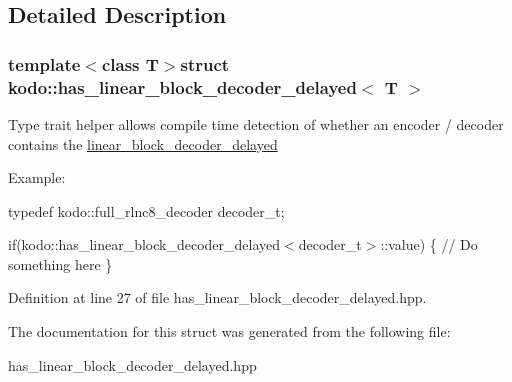 \subsection{Detailed Description}
\subsubsection*{template$<$class T$>$struct kodo\-::has\-\_\-linear\-\_\-block\-\_\-decoder\-\_\-delayed$<$ T $>$}

Type trait helper allows compile time detection of whether an encoder / decoder contains the \hyperlink{classkodo_1_1linear__block__decoder__delayed}{linear\-\_\-block\-\_\-decoder\-\_\-delayed}

Example\-:

typedef kodo\-::full\-\_\-rlnc8\-\_\-decoder decoder\-\_\-t;

if(kodo\-::has\-\_\-linear\-\_\-block\-\_\-decoder\-\_\-delayed$<$decoder\-\_\-t$>$\-::value) \{ // Do something here \} 

Definition at line 27 of file has\-\_\-linear\-\_\-block\-\_\-decoder\-\_\-delayed.\-hpp.



The documentation for this struct was generated from the following file\-:\begin{DoxyCompactItemize}
\item 
has\-\_\-linear\-\_\-block\-\_\-decoder\-\_\-delayed.\-hpp\end{DoxyCompactItemize}
